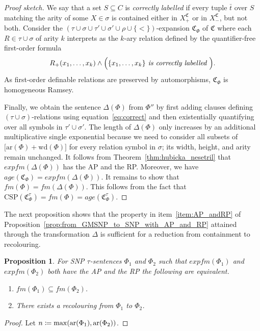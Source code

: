\documentclass[oneside,reqno,12pt]{amsart}
\theoremstyle{plain}
\newtheorem{proposition}[thm]{Proposition}
\theoremstyle{remark}
\renewcommand{\coloneqq}{\mathrel{\mathop:}\mathrel{\mkern-1.2mu}=}
\newcommand{\struct}[1]{\mathfrak{#1}}
\newcommand{\CSP}{\ensuremath{\mathrm{CSP}}\xspace}
\newcommand{\age}{\ensuremath{\mathit{age}}\xspace}
\newcommand{\fm}{\ensuremath{\mathit{fm}}\xspace}
\newcommand{\efm}{\ensuremath{\mathit{expfm}}\xspace}
\newcommand{\wh}{\ensuremath{\mathrm{wd}}\xspace}
\newcommand{\ar}{\ensuremath{\mathrm{ar}}\xspace}
\begin{document}
{\begin{proof}[Proof sketch]
We say that a set $S\subseteq C$ is \emph{correctly labelled} if every tuple $\bar{t}$ over $S$ matching the arity of some $X\in \sigma$ is contained either in $X_+^{\struct{C}}$ or in $X_-^{\struct{C}}$, but not both.
Consider the $(\tau\cup\sigma\cup \tau'\cup \sigma' \cup \rho \cup \{<\})$-expansion $\struct{C}_{\Phi}$ of $\struct{C}$ where each $R\in \tau\cup \sigma$ of arity $k$ interprets as the $k$-ary relation defined by the quantifier-free first-order formula
\begin{align}
R_+(x_1,\dots,x_k) \wedge \Bigl(\{x_1,\dots, x_k\} \textit{ is correctly labelled }\Bigr). \label{eq:correct}    
\end{align}
As first-order definable relations are preserved by automorphisms, $\struct{C}_{\Phi}$ is homogeneous Ramsey.


 

Finally, we obtain the sentence $\Delta(\Phi)$ from $\Phi''$  by first adding clauses defining $(\tau\cup \sigma)$-relations using equation~\eqref{eq:correct} and then existentially quantifying over all symbols in $\tau'\cup \sigma'$.
The length of $\Delta(\Phi)$ only increases by an additional multiplicative single exponential because we need to consider all subsets of $\bigl[\ar(\Phi)+\wh(\Phi)\bigr]$ for every relation symbol in $\sigma$; its width, height, and arity remain unchanged.
It follows from Theorem~\ref{thm:hubicka_nesetril} that $\efm(\Delta(\Phi))$ has the AP and the RP. 
Moreover, we have $\age(\struct{C}_{\Phi})=\efm(\Delta(\Phi))$.
It remains to show that $\fm(\Phi)=\fm(\Delta(\Phi))$. 
This follows from the fact that $\CSP(\struct{C}_{\Phi}^{\tau})=\fm(\Phi)=\age(\struct{C}_{\Phi}^{\tau})$.
\end{proof}


The next proposition shows that the property in item~\eqref{item:AP_andRP} of Proposition~\ref{prop:from_GMSNP_to_SNP_with_AP_and_RP} attained through the transformation $\Delta$ is sufficient for a reduction from containment to recolouring.
 
 \begin{proposition}    \label{prop:recolouring_containment}
  For SNP $\tau$-sentences $\Phi_1$ and $\Phi_2$ such that $\efm(\Phi_1)$ and $\efm(\Phi_2)$ both have the AP and the RP  the following are equivalent.
\begin{enumerate}
        \item \label{item:recolouring1} $\fm(\Phi_1)\subseteq \fm(\Phi_2)$.
        \item \label{item:recolouring2} There exists a recolouring from $\Phi_1$ to $\Phi_2$.
    \end{enumerate}  
\end{proposition}    
\begin{proof} Let $n\coloneqq \max(\ar(\Phi_1),\ar(\Phi_2))$.


\end{proof}}
\end{document}
